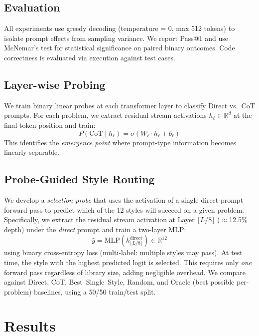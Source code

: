 \documentclass[11pt]{article}
\begin{document}
\subsection{Evaluation}

All experiments use greedy decoding (temperature = 0, max 512 tokens) to isolate prompt effects from sampling variance. We report Pass@1 and use McNemar's test for statistical significance on paired binary outcomes. Code correctness is evaluated via execution against test cases.

\subsection{Layer-wise Probing}

We train binary linear probes at each transformer layer to classify Direct vs.\ CoT prompts. For each problem, we extract residual stream activations $h_\ell \in \mathbb{R}^d$ at the final token position and train:
\begin{equation}
    P(\text{CoT} \mid h_\ell) = \sigma(W_\ell \cdot h_\ell + b_\ell)
\end{equation}
This identifies the \emph{emergence point} where prompt-type information becomes linearly separable.

\subsection{Probe-Guided Style Routing}

We develop a \emph{selection probe} that uses the activation of a single direct-prompt forward pass to predict which of the 12 styles will succeed on a given problem. Specifically, we extract the residual stream activation at Layer $\lfloor L/8 \rfloor$ ($\approx$12.5\% depth) under the \emph{direct} prompt and train a two-layer MLP:
\begin{equation}
    \hat{y} = \text{MLP}(h_{\lfloor L/8 \rfloor}^{\text{direct}}) \in \mathbb{R}^{12}
\end{equation}
using binary cross-entropy loss (multi-label: multiple styles may pass). At test time, the style with the highest predicted logit is selected. This requires only \emph{one} forward pass regardless of library size, adding negligible overhead. We compare against Direct, CoT, Best~Single~Style, Random, and Oracle (best possible per-problem) baselines, using a 50/50 train/test split.

\section{Results}
\end{document}
